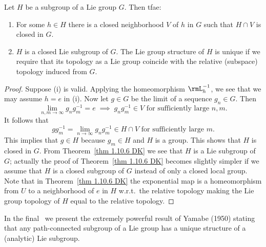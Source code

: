 \begin{cor}\label{cor 1.10.7 DK}
    Let $H$ be a subgroup of a Lie group $G$. Then \gls{tfae}:
    \begin{enumerate}[label=(\roman*)]
        \item For some $h\in H$ there is a closed neighborhood $V$ of $h$ in $G$ such that $H\cap V$ is closed in $G$.
        \item $H$ is a closed Lie subgroup of $G$. The Lie group structure of $H$ is unique if we require that its topology as a Lie group coincide with the relative (subspace) topology induced from $G$.
    \end{enumerate}
\end{cor}
\begin{proof}
    Suppose (i) is valid. Applying the homeomorphism $\rmL_h^{-1}$, we see that we may assume $h=e$ in (i). Now let $g\in G$ be the limit of a sequence $g_n\in G$. Then
    \[\lim_{n,m\to\infty} g_ng_m^{-1}=e\;\implies\; g_ng_m^{-1}\in V\text{ for sufficiently large }n,m.\]
    It follows that
    \[gg_m^{-1}=\lim_{n\to\infty} g_ng_m^{-1}\in H\cap V\text{ for sufficiently large }m.\]
    This implies that $g\in H$ because $g_m\in H$ and $H$ is a group. This shows that $H$ is closed in $G$. From Theorem~\ref{thm 1.10.6 DK} we see that $H$ is a Lie subgroup of $G$; actually the proof of Theorem~\ref{thm 1.10.6 DK} becomes slightly simpler if we assume that $H$ is a closed subgroup of $G$ instead of only a closed local group. Note that in Theorem~\ref{thm 1.10.6 DK} the exponential map is a homeomorphism from $U$ to a neighborhood of $e$ in $H$ w.r.t.\ the relative topology making the Lie group topology of $H$ equal to the relative topology.
\end{proof}

In the final \sect\ we present the extremely powerful result of Yamabe (1950) stating that any path-connected subgroup of a Lie group has a unique structure of a (analytic) Lie subgroup.





